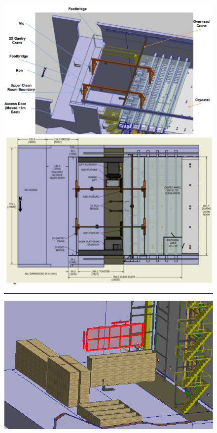 \begin{figure}[htbp]
\begin{center}
\begin{minipage}[c]{0.49\textwidth}
\includegraphics[width=\textwidth]{far-detector-single-phase/figures/Install-ISO-Top.pdf}
\end{minipage}
\begin{minipage}[c]{0.49\textwidth}
\includegraphics[width=\textwidth]{far-detector-single-phase/figures/Install-TopView.pdf}
\end{minipage}
%
\vspace{5mm}
\hrule
\vspace{5mm}
%
\begin{minipage}[c]{0.32\textwidth}
\includegraphics[width=\textwidth]{far-detector-single-phase/figures/APA-1.pdf}

\end{minipage}
\end{center}
\end{figure}

